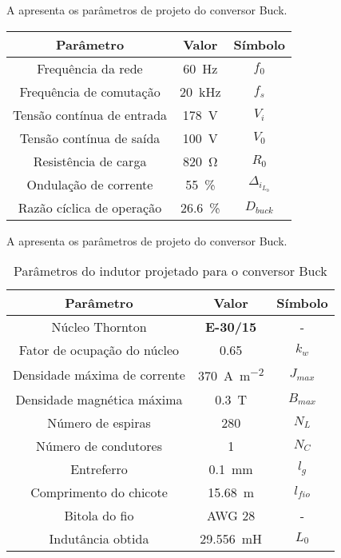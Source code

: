 A  apresenta os parâmetros de projeto do conversor Buck.

\begin{center}
	\label{tab:parametrosBuck}
	\begin{tabular}{@{}ccc@{}}
		\toprule
		\textbf{Parâmetro} & \textbf{Valor} & \textbf{Símbolo} \\ \midrule			
		Frequência  da rede        & \SI{60}{\hertz}     & $f_0$  \\		
		Frequência de comutação        & \SI{20}{\kilo\hertz}     & $f_s$  \\	
		Tensão contínua de entrada         &  \SI{178}{\V}      & $V_i$  \\
		Tensão contínua de saída         &  \SI{100}{\V}      & $V_0$  \\
		Resistência de carga        & \SI{820}{\ohm}      & $R_0$  \\
		Ondulação de corrente       & \SI{55}{\%}    & $\Delta_{i_{L_0}}$    \\ 
		Razão cíclica de operação       & \SI{26.6}{\%}    & $D_{buck}$    \\  \bottomrule	
	\end{tabular}
\end{center}

A  apresenta os parâmetros de projeto do conversor Buck.
\begin{table}[!ht]
	\centering
	\caption{Parâmetros do indutor projetado para o conversor Buck}
	\label{tab:IndutorBuck}
	\begin{tabular}{@{}ccc@{}}
		\toprule
		\textbf{Parâmetro} & \textbf{Valor} & \textbf{Símbolo} \\ \midrule	
			Núcleo  Thornton      & \textbf{E-30/15}    & -  \\				
		Fator de ocupação do núcleo & \SI{0.65}{}     & $k_w$  \\
		Densidade máxima de corrente & \SI{370}{\ampere\per\square\meter}     & $J_{max}$  \\
		Densidade magnética máxima & \SI{0.3}{\tesla}     & $B_{max}$  \\			
		Número de espiras        & \SI{280}{}     & $N_L$  \\	
		Número de condutores        & \SI{1}{}     & $N_C$  \\		
		Entreferro         &  \SI{0.1}{\mm}      & $l_g$  \\
		Comprimento do chicote        &  \SI{15.68}{\m}      & $l_{fio}$  \\
		Bitola do fio        &  AWG 28     & -  \\
		Indutância obtida         & \SI{29.556}{\milli\henry}     & $L_0$  \\ \bottomrule	
	\end{tabular}
\end{table}



